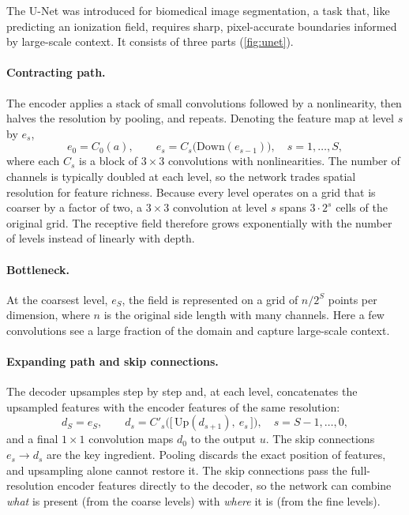 The U-Net \citep{ronneberger2015unet} was introduced for biomedical image segmentation, a task that, like predicting an ionization field, requires sharp, pixel-accurate boundaries informed by large-scale context. It consists of three parts (\cref{fig:unet}).

\paragraph{Contracting path.} The encoder applies a stack of small convolutions followed by a nonlinearity, then halves the resolution by pooling, and repeats. Denoting the feature map at level $s$ by $e_s$,
\begin{equation}
  \label{eq:unet-encoder}
  e_0 = C_0(a), \qquad e_{s} = C_s\big(\mathrm{Down}(e_{s-1})\big), \quad s = 1,\dots,S,
\end{equation}
where each $C_s$ is a block of $3\times3$ convolutions with nonlinearities. The number of channels is typically doubled at each level, so the network trades spatial resolution for feature richness. Because every level operates on a grid that is coarser by a factor of two, a $3\times3$ convolution at level $s$ spans $3\cdot2^{s}$ cells of the original grid. The receptive field therefore grows exponentially with the number of levels instead of linearly with depth.

\paragraph{Bottleneck.} At the coarsest level, $e_S$, the field is represented on a grid of $n/2^{S}$ points per dimension, where $n$ is the original side length with many channels. Here a few convolutions see a large fraction of the domain and capture large-scale context.

\paragraph{Expanding path and skip connections.} The decoder upsamples step by step and, at each level, concatenates the upsampled features with the encoder features of the same resolution:
\begin{equation}
  \label{eq:unet-decoder}
  d_S = e_S, \qquad d_s = C'_s\big(\big[\,\mathrm{Up}(d_{s+1}),\ e_s\,\big]\big), \quad s = S-1,\dots,0,
\end{equation}
and a final $1\times1$ convolution maps $d_0$ to the output $u$. The skip connections $e_s\to d_s$ are the key ingredient. Pooling discards the exact position of features, and upsampling alone cannot restore it. The skip connections pass the full-resolution encoder features directly to the decoder, so the network can combine \emph{what} is present (from the coarse levels) with \emph{where} it is (from the fine levels).

